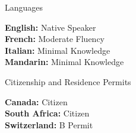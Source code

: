 \documentclass{cv}
\begin{document}

\begin{rSection}{Languages}

{\bf English:} Native Speaker \vspace{0.15em}\\
{\bf French:} Moderate Fluency \vspace{0.15em}\\
{\bf Italian:} Minimal Knowledge \vspace{0.15em}\\
{\bf Mandarin:} Minimal Knowledge


\end{rSection}


\begin{rSection}{Citizenship and Residence Permits}

{\bf Canada:} Citizen \vspace{0.15em}\\
{\bf South Africa:} Citizen \vspace{0.15em}\\
{\bf Switzerland:} B Permit

\end{rSection}

\end{document}
